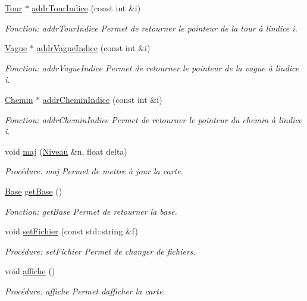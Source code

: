\begin{DoxyCompactItemize}
\hyperlink{classTour}{Tour} $\ast$ \hyperlink{classCarte_a573a9aa2b9917152357b710fe0be6ecc}{addr\+Tour\+Indice} (const int \&i)
\begin{DoxyCompactList}\small\item\em Fonction\+: addr\+Tour\+Indice Permet de retourner le pointeur de la tour à l\textquotesingle{}indice i. \end{DoxyCompactList}\item 
\hyperlink{classVague}{Vague} $\ast$ \hyperlink{classCarte_a21708cf932e4d0e74ed0222f7950582a}{addr\+Vague\+Indice} (const int \&i)
\begin{DoxyCompactList}\small\item\em Fonction\+: addr\+Vague\+Indice Permet de retourner le pointeur de la vague à l\textquotesingle{}indice i. \end{DoxyCompactList}\item 
\hyperlink{classChemin}{Chemin} $\ast$ \hyperlink{classCarte_a16a507cb5eb10f57f0d34052db75689c}{addr\+Chemin\+Indice} (const int \&i)
\begin{DoxyCompactList}\small\item\em Fonction\+: addr\+Chemin\+Indice Permet de retourner le pointeur du chemin à l\textquotesingle{}indice i. \end{DoxyCompactList}\item 
void \hyperlink{classCarte_a6d721dfc81b3a45f038c73d20e80d545}{maj} (\hyperlink{classNiveau}{Niveau} \&n, float delta)
\begin{DoxyCompactList}\small\item\em Procédure\+: maj Permet de mettre à jour la carte. \end{DoxyCompactList}\item 
\hyperlink{classBase}{Base} \hyperlink{classCarte_af76239ad9a307cf94ba0916ea477a331}{get\+Base} ()
\begin{DoxyCompactList}\small\item\em Fonction\+: get\+Base Permet de retourner la base. \end{DoxyCompactList}\item 
void \hyperlink{classCarte_a66c41e01a4a8730630bd77b6dd1b670e}{set\+Fichier} (const std\+::string \&f)
\begin{DoxyCompactList}\small\item\em Procédure\+: set\+Fichier Permet de changer de fichiers. \end{DoxyCompactList}\item 
void \hyperlink{classCarte_aef8696f9e6017496583bf32fb7cceb80}{affiche} ()
\begin{DoxyCompactList}\small\item\em Procédure\+: affiche Permet d\textquotesingle{}afficher la carte. \end{DoxyCompactList}\end{DoxyCompactItemize}


